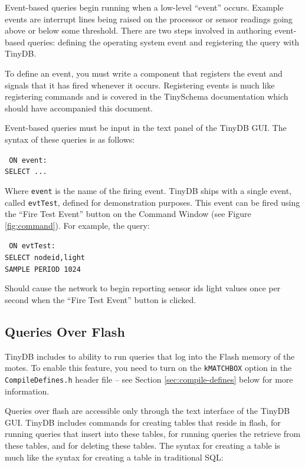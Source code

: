 \documentclass[11pt]{article}
\renewcommand{\baselinestretch}{1.2}
\newcommand{\sqlquery}[1]{
{\renewcommand\baselinestretch{.8}\rm
\begin{samepage}
\setlength{\parskip}{.1\baselineskip} 
\small
\hspace{.3in}\parbox[t]{5in}{\setlength{\parindent}{-.1in}\tt{#1}\\}
\normalsize
\renewcommand\baselinestretch{1.0}\rm
\end{samepage}
}}
\begin{document}
Event-based queries begin running when a low-level ``event'' occurs.  Example
events are interrupt lines being raised on the processor or sensor readings
going above or below some threshold.  There are two steps involved in authoring
event-based queries:  defining the operating system event and registering
the query with TinyDB.  

To define an event, you must write a component that registers the event and
signals that it has fired whenever it occurs.  Registering events is much 
like registering commands and is covered in the TinySchema documentation which
should have accompanied this document.

Event-based queries must be input in the text panel of the TinyDB GUI.  The
syntax of these queries is as follows:

\sqlquery{
ON event: \\
SELECT ... 
}

Where {\tt event} is the name of the firing event.  TinyDB ships with
a single event, called {\tt evtTest}, defined for demonstration
purposes.  This event can be fired using the ``Fire Test Event''
button on the Command Window (see Figure \ref{fig:command}).  For example,
the query:

\sqlquery{
ON evtTest: \\
SELECT nodeid,light \\
SAMPLE PERIOD 1024
}

Should cause the network to begin reporting sensor ids light values once
per second when the ``Fire Test Event'' button is clicked.


\subsection{Queries Over Flash}\label{sec:flash}

TinyDB includes to ability to run queries that log into the Flash
memory of the motes.  To enable this feature, you need to turn on the
{\tt kMATCHBOX} option in the {\tt CompileDefines.h} header file --
see Section \ref{sec:compile-defines} below for more information.

Queries over flash are accessible only through the text interface of
the TinyDB GUI.  TinyDB includes commands for creating tables that
reside in flash, for running queries that insert into these tables,
for running queries the retrieve from these tables, and for deleting
these tables.  The syntax for creating a table is much like the syntax
for creating a table in traditional SQL:
\end{document}
